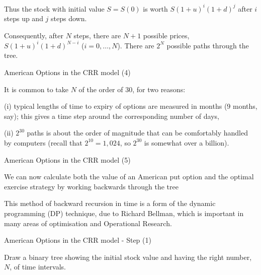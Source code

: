 	Thus the stock with initial value $S = S(0)$ is worth $S (1+u)^i
(1+d)^j$ after $i$ steps up and $j$ steps down.


	Consequently,
after $N$ steps, there are $N+1$ possible prices, $S (1+u)^i
(1+d)^{N-i}$ ($i = 0, \ldots, N$). There are $2^N$ possible paths
through the tree.





{ American Options in the CRR model (4)}






	It is common to take $N$ of the order of 30, for
two reasons:






	(i) typical lengths of time to expiry of
options are measured in months (9 months, say); this
gives a time step around the corresponding number of days,


	(ii) $2^{30}$ paths is about the order of magnitude that can be
comfortably handled by computers (recall that $2^{10} = 1,024$, so
$2^{30}$ is somewhat over a billion).









{ American Options in the CRR model (5)}







	We can now calculate both the value of an American put option and
the optimal exercise strategy by working backwards through the
tree


	This method of backward recursion in time is a form of the
dynamic programming (DP) technique, \label{dynamic programming}
due to Richard Bellman, which is important in many areas of
optimisation and Operational Research.





{American Options in the CRR model - Step (1)}







	Draw a binary
tree showing the initial stock value and having the
right number, $N$, of time intervals.


